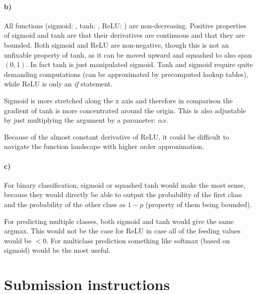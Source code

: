 \begin{solution}
    \paragraph{b)}

    All functions (sigmoid: , tanh: , ReLU: ) are non-decreasing. Positive properties of sigmoid and tanh are that their derivatives are continuous and that they are bounded. Both sigmoid and ReLU are non-negative, though this is not an unfixable property of tanh, as it can be moved upward and squashed to also span $(0, 1)$. In fact tanh is just manipulated sigmoid. Tanh and sigmoid require quite demanding computations (can be approximated by precomputed lookup tables), while ReLU is only an \textit{if} statement.
    
    Sigmoid is more stretched along the x axis and therefore in comparison the gradient of tanh is more concentrated around the origin. This is also adjustable by just multiplying the argument by a parameter: $\alpha x$.
    
    Because of the almost constant derivative of ReLU, it could be difficult to navigate the function landscape with higher order approximation.
    
    \paragraph{c)}
    
    For binary classification, sigmoid or squashed tanh would make the most sense, because they would directly be able to output the probability of the first class and the probability of the other class as $1-p$ (property of them being bounded).
    
    For predicting multiple classes, both sigmoid and tanh would give the same argmax. This would not be the case for ReLU in case all of the feeding values would be $<0$. For multiclass prediction something like softmax (based on sigmoid) would be the most useful.
    
\end{solution}


\clearpage

\section*{Submission instructions}


